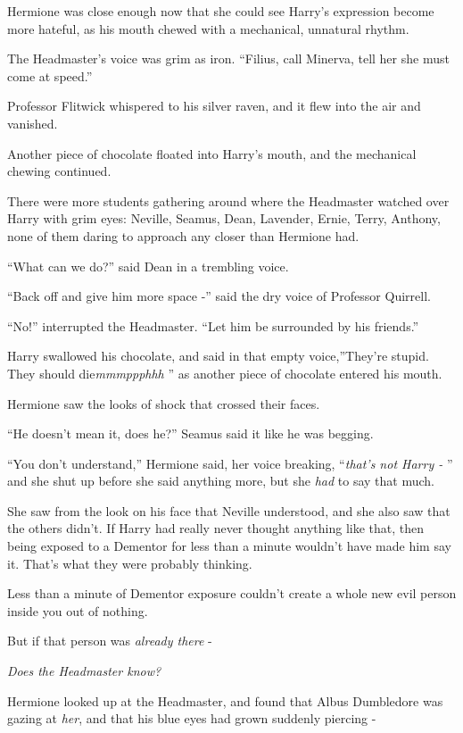 Hermione was close enough now that she could see Harry's expression
become more hateful, as his mouth chewed with a mechanical, unnatural
rhythm.

The Headmaster's voice was grim as iron. ``Filius, call Minerva, tell
her she must come at speed.''

Professor Flitwick whispered to his silver raven, and it flew into the
air and vanished.

Another piece of chocolate floated into Harry's mouth, and the
mechanical chewing continued.

There were more students gathering around where the Headmaster watched
over Harry with grim eyes: Neville, Seamus, Dean, Lavender, Ernie,
Terry, Anthony, none of them daring to approach any closer than Hermione
had.

``What can we do?'' said Dean in a trembling voice.

``Back off and give him more space -'' said the dry voice of Professor
Quirrell.

``No!'' interrupted the Headmaster. ``Let him be surrounded by his
friends.''

Harry swallowed his chocolate, and said in that empty voice,''They're
stupid. They should die\emph{mmmppphhh} '' as another piece of chocolate
entered his mouth.

Hermione saw the looks of shock that crossed their faces.

``He doesn't mean it, does he?'' Seamus said it like he was begging.

``You don't understand,'' Hermione said, her voice breaking,
``\emph{that's not Harry -} '' and she shut up before she said anything
more, but she \emph{had} to say that much.

She saw from the look on his face that Neville understood, and she also
saw that the others didn't. If Harry had really never thought anything
like that, then being exposed to a Dementor for less than a minute
wouldn't have made him say it. That's what they were probably thinking.

Less than a minute of Dementor exposure couldn't create a whole new evil
person inside you out of nothing.

But if that person was \emph{already there} -

\emph{Does the Headmaster know?}

Hermione looked up at the Headmaster, and found that Albus Dumbledore
was gazing at \emph{her}, and that his blue eyes had grown suddenly
piercing -

